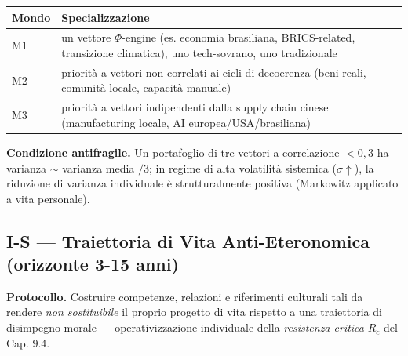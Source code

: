 {\def\LTcaptype{none} %
{\small\begin{longtable}[]{@{}
  >{\raggedright\arraybackslash}p{}
  >{\raggedright\arraybackslash}p{}@{}}
\toprule\noalign{}
\begin{minipage}[b]{\linewidth}\raggedright
Mondo
\end{minipage} & \begin{minipage}[b]{\linewidth}\raggedright
Specializzazione
\end{minipage} \\
\midrule\noalign{}
\endhead
\bottomrule\noalign{}
\endlastfoot
M1 & un vettore \(\Phi\)-engine (es. economia brasiliana, BRICS-related,
transizione climatica), uno tech-sovrano, uno tradizionale \\
M2 & priorità a vettori non-correlati ai cicli di decoerenza (beni
reali, comunità locale, capacità manuale) \\
M3 & priorità a vettori indipendenti dalla supply chain cinese
(manufacturing locale, AI europea/USA/brasiliana) \\
\end{longtable}}
}

\Proved{} \textbf{Condizione antifragile.} Un portafoglio di tre vettori
a correlazione \(< 0{,}3\) ha varianza \(\sim\) varianza media \(/ 3\);
in regime di alta volatilità sistemica (\(\sigma \uparrow\)), la
riduzione di varianza individuale è strutturalmente positiva (Markowitz
applicato a vita personale).

\subsection{I-S --- Traiettoria di Vita Anti-Eteronomica (orizzonte 3-15
anni)}\label{i-s-traiettoria-di-vita-anti-eteronomica-orizzonte-3-15-anni}

\Hypoth{} \textbf{Protocollo.} Costruire competenze, relazioni e
riferimenti culturali tali da rendere \emph{non sostituibile} il proprio
progetto di vita rispetto a una traiettoria di disimpegno morale ---
operativizzazione individuale della \emph{resistenza critica} \(R_c\)
del Cap. 9.4.

